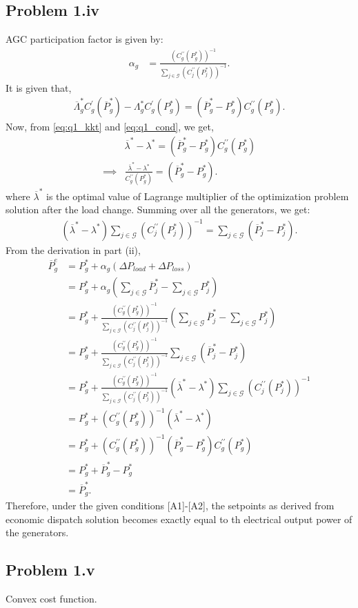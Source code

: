 \subsection*{Problem 1.iv}
AGC participation factor is given by:
\begin{align*}
	\alpha_g &= \frac{(C^{\prime\prime}_g(P_g^*))^{-1}}{\sum_{j \in \mathcal{G}}(C^{\prime\prime}_j(P_j^*))^{-1}}.
\end{align*} 
It is given that,
\begin{align}\label{eq:q1_cond}
	\overline{\Lambda}_g^*C^{\prime}_g(\overline{P}_g^*)-\Lambda_g^*C^{\prime}_g(P_g^*) = (\overline{P}_g^*-P_g^*)C^{\prime\prime}_g(P_g^*).
\end{align}
Now, from \ref{eq:q1_kkt} and \ref{eq:q1_cond}, we get,
\begin{align*}
	&\overline{\lambda}^* - \lambda^* = (\overline{P}_g^*-P_g^*)C^{\prime\prime}_g(P_g^*)\\
	\implies & \frac{\overline{\lambda}^* - \lambda^*}{C^{\prime\prime}_g(P_g^*)} = (\overline{P}_g^*-P_g^*).
\end{align*}
where $\overline{\lambda}^*$ is the optimal value of Lagrange multiplier of the optimization problem solution after the load change. Summing over all the generators, we get:
\begin{align*}
	(\overline{\lambda}^*-\lambda^*)\sum_{j \in \mathcal{G}}(C^{\prime \prime}_j(P_j^*))^{-1} = \sum_{j \in \mathcal{G}}(\overline{P}_j^*-P_j^*).
\end{align*}
From the derivation in part (ii),
\begin{align*}
	\overline{P}_g^e &= P_{g}^*+\alpha_g \left(\Delta P_{load} + \Delta P_{loss}\right)\\
	&= P_g^* + \alpha_g\left(\sum_{j \in \mathcal{G}}\overline{P}_j^* - \sum_{j \in \mathcal{G}}P_j^*\right)\\
	&= P_g^* + \frac{(C^{\prime\prime}_g(P_g^*))^{-1}}{\sum_{j \in \mathcal{G}}(C^{\prime\prime}_j(P_j^*))^{-1}}\left(\sum_{j \in \mathcal{G}}\overline{P}_j^* - \sum_{j \in \mathcal{G}}P_j^*\right)\\
	&= P_g^* + \frac{(C^{\prime\prime}_g(P_g^*))^{-1}}{\sum_{j \in \mathcal{G}}(C^{\prime\prime}_j(P_j^*))^{-1}} \sum_{j \in \mathcal{G}}(\overline{P}_j^*-P_j^*)\\
	&= P_g^* + \frac{(C^{\prime\prime}_g(P_g^*))^{-1}}{\sum_{j \in \mathcal{G}}(C^{\prime\prime}_j(P_j^*))^{-1}} (\overline{\lambda}^*-\lambda^*)\sum_{j \in \mathcal{G}}(C^{\prime \prime}_j(P_j^*))^{-1}\\
	&= P_g^* + (C^{\prime\prime}_g(P_g^*))^{-1} (\overline{\lambda}^*-\lambda^*)\\
	&= P_g^* + (C^{\prime\prime}_g(P_g^*))^{-1}(\overline{P}_g^*-P_g^*)C^{\prime\prime}_g(P_g^*)\\
	&= P_g^* + \overline{P}_g^*-P_g^*\\
	&= \overline{P}_g^*.
\end{align*}
Therefore, under the given conditions [A1]-[A2], the setpoints as derived from economic dispatch solution becomes exactly equal to th electrical output power of the generators. 
\subsection*{Problem 1.v}
Convex cost function.